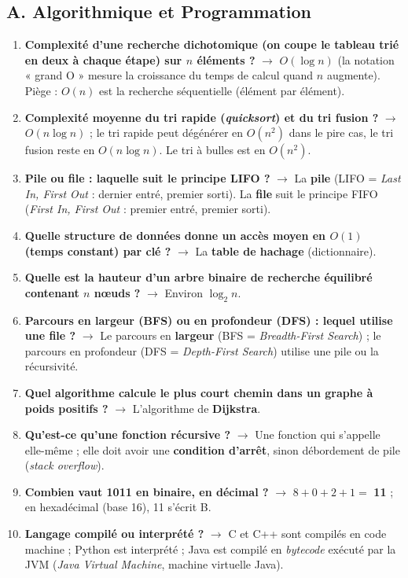 \subsection*{A. Algorithmique et Programmation}
\begin{enumerate}[leftmargin=*]
    \item \textbf{Complexité d'une recherche dichotomique (on coupe le tableau trié en deux à chaque étape) sur $n$ éléments ?} $\rightarrow$ $O(\log n)$ (la notation « grand O » mesure la croissance du temps de calcul quand $n$ augmente). Piège : $O(n)$ est la recherche séquentielle (élément par élément).
    \item \textbf{Complexité moyenne du tri rapide (\textit{quicksort}) et du tri fusion ?} $\rightarrow$ $O(n \log n)$ ; le tri rapide peut dégénérer en $O(n^2)$ dans le pire cas, le tri fusion reste en $O(n \log n)$. Le tri à bulles est en $O(n^2)$.
    \item \textbf{Pile ou file : laquelle suit le principe LIFO ?} $\rightarrow$ La \textbf{pile} (LIFO = \textit{Last In, First Out} : dernier entré, premier sorti). La \textbf{file} suit le principe FIFO (\textit{First In, First Out} : premier entré, premier sorti).
    \item \textbf{Quelle structure de données donne un accès moyen en $O(1)$ (temps constant) par clé ?} $\rightarrow$ La \textbf{table de hachage} (dictionnaire).
    \item \textbf{Quelle est la hauteur d'un arbre binaire de recherche équilibré contenant $n$ nœuds ?} $\rightarrow$ Environ $\log_2 n$.
    \item \textbf{Parcours en largeur (BFS) ou en profondeur (DFS) : lequel utilise une file ?} $\rightarrow$ Le parcours en \textbf{largeur} (BFS = \textit{Breadth-First Search}) ; le parcours en profondeur (DFS = \textit{Depth-First Search}) utilise une pile ou la récursivité.
    \item \textbf{Quel algorithme calcule le plus court chemin dans un graphe à poids positifs ?} $\rightarrow$ L'algorithme de \textbf{Dijkstra}.
    \item \textbf{Qu'est-ce qu'une fonction récursive ?} $\rightarrow$ Une fonction qui s'appelle elle-même ; elle doit avoir une \textbf{condition d'arrêt}, sinon débordement de pile (\textit{stack overflow}).
    \item \textbf{Combien vaut 1011 en binaire, en décimal ?} $\rightarrow$ $8 + 0 + 2 + 1 = $ \textbf{11} ; en hexadécimal (base 16), 11 s'écrit B.
    \item \textbf{Langage compilé ou interprété ?} $\rightarrow$ C et C++ sont compilés en code machine ; Python est interprété ; Java est compilé en \textit{bytecode} exécuté par la JVM (\textit{Java Virtual Machine}, machine virtuelle Java).
\end{enumerate}

